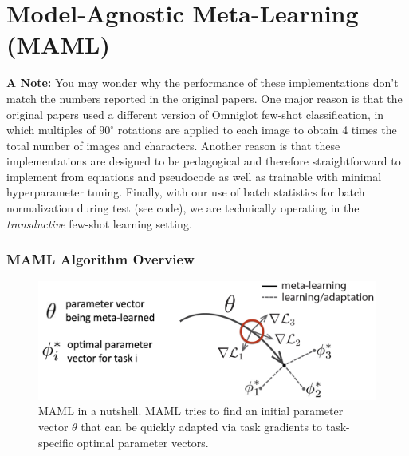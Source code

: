 \section{Model-Agnostic Meta-Learning (MAML)~\cite{maml}}

\textbf{A Note: }
You may wonder why the performance of these implementations don't match the numbers reported in the original papers. One major reason is that the original papers used a different version of Omniglot few-shot classification, in which multiples of $90^{\circ}$ rotations are applied to each image to obtain 4 times the total number of images and characters. Another reason is that these implementations are designed to be pedagogical and therefore straightforward to implement from equations and pseudocode as well as trainable with minimal hyperparameter tuning. Finally, with our use of batch statistics for batch normalization during test (see code), we are technically operating in the \emph{transductive} few-shot learning setting.

\subsubsection*{MAML Algorithm Overview}

\begin{figure}[H]
\centering
\includegraphics[width=0.8\linewidth]{./figures/MAML}
\vspace{-3mm}
\caption{MAML in a nutshell. MAML tries to find an initial parameter vector $\theta$ that can be quickly adapted via task gradients to task-specific optimal parameter vectors.}
\label{fig:maml}
\end{figure}

